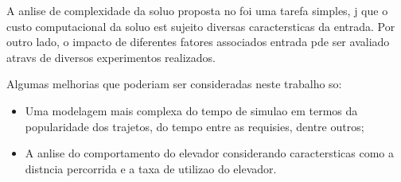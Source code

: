 \documentclass[12pt]{article}
\begin{document}
A anlise de complexidade da soluo proposta no foi uma tarefa simples, j que o custo computacional da soluo est sujeito  diversas caractersticas da entrada. Por outro lado, o impacto de diferentes fatores associados  entrada pde ser avaliado atravs de diversos experimentos realizados.

Algumas melhorias que poderiam ser consideradas neste trabalho so:
\begin{itemize}
\item Uma modelagem mais complexa do tempo de simulao em termos da popularidade dos trajetos, do tempo entre as requisies, dentre outros;
\item A anlise do comportamento do elevador considerando caractersticas como a distncia percorrida e a taxa de utilizao do elevador.
\end{itemize}


\end{document}
